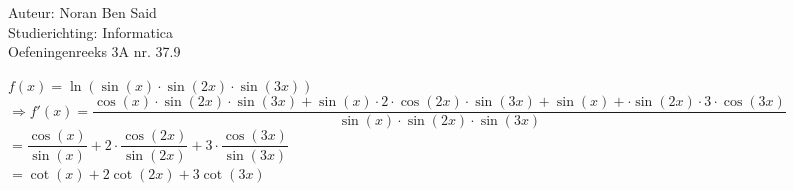 \documentclass[a4paper]{article}
\begin{document}
\noindent \large Auteur: Noran Ben Said\\
\noindent \large Studierichting: Informatica\\
\noindent \large Oefeningenreeks 3A nr. 37.9 \\

\medskip
\normalsize

$f(x) = \ln(\sin(x) \cdot \sin(2x) \cdot \sin(3x))$ \\

$ \Rightarrow f'(x) = \dfrac{\cos(x) \cdot \sin(2x) \cdot \sin(3x) + \sin(x) \cdot 2 \cdot \cos(2x) \cdot \sin(3x) + \sin(x) + \cdot \sin(2x) \cdot 3 \cdot \cos(3x) }{\sin(x) \cdot \sin(2x) \cdot \sin(3x)} $\\

$ = \dfrac{\cos(x)}{\sin(x)} + 2 \cdot \dfrac{\cos(2x)}{\sin(2x)} + 3 \cdot \dfrac{\cos(3x)}{\sin(3x)} $\\

$ = \cot(x) + 2\cot(2x) + 3 \cot(3x) $ \\


\begin{thebibliography}{999}
\end{thebibliography}
\end{document}
